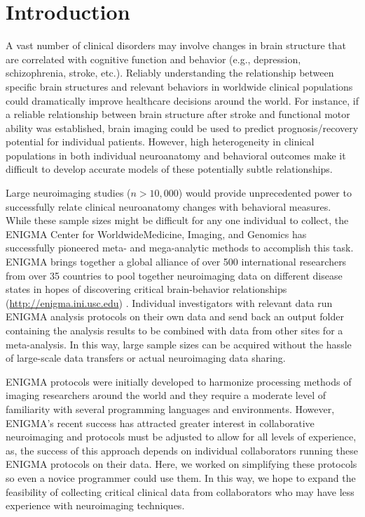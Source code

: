 \documentclass[twocolumn]{bmcart}%
\begin{document}
\section{Introduction}\label{introduction}

A vast number of clinical disorders may involve changes in brain structure that are correlated with cognitive function and behavior (e.g., depression, schizophrenia, stroke, etc.). Reliably understanding the relationship between specific brain structures and relevant behaviors in worldwide clinical populations could dramatically improve healthcare decisions around the world. For instance, if a reliable relationship between brain structure after stroke and functional motor ability was established, brain imaging could be used to predict prognosis/recovery potential for individual patients. However, high heterogeneity in clinical populations in both individual neuroanatomy and behavioral outcomes make it difficult to develop accurate models of these potentially subtle relationships.

Large neuroimaging studies ($n>10,000$) would provide unprecedented power to successfully relate clinical neuroanatomy changes with behavioral measures. While these sample sizes might be difficult for any one individual to collect, the ENIGMA Center for WorldwideMedicine, Imaging, and Genomics has successfully pioneered meta- and mega-analytic methods to accomplish this task. ENIGMA brings together a global alliance of over 500 international researchers from over 35 countries to pool together neuroimaging data on different disease states in hopes of discovering critical brain-behavior relationships (\url{http://enigma.ini.usc.edu}) \cite{Thompson2015,Hibar2015}. Individual investigators with relevant data run ENIGMA analysis protocols on their own data and send back an output folder containing the analysis results to be combined with data from other sites for a meta-analysis. In this way, large sample sizes can be acquired without the hassle of large-scale data transfers or actual neuroimaging data sharing.

ENIGMA protocols were initially developed to harmonize processing methods of imaging researchers around the world and they require a moderate level of familiarity with several programming languages and environments. However, ENIGMA's recent success has attracted greater interest in collaborative neuroimaging and protocols must be adjusted to allow for all levels of experience, as, the success of this approach depends on individual collaborators running these ENIGMA protocols on their data. Here, we worked on simplifying these protocols so even a novice programmer could use them. In this way, we hope to expand the feasibility of collecting critical clinical data from collaborators who may have less experience with neuroimaging techniques.
\end{document}
